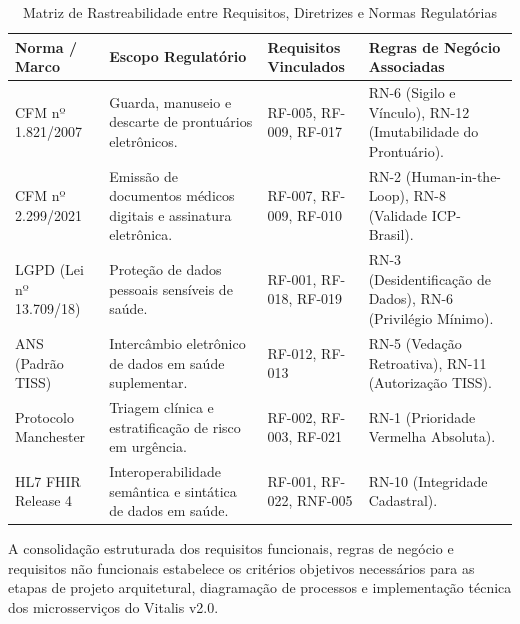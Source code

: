 \begin{table}[H]
\centering
\small
\caption{Matriz de Rastreabilidade entre Requisitos, Diretrizes e Normas Regulatórias}
\label{tab:rastreabilidade_vitalis}
\begin{tabularx}{\textwidth}{>{\raggedright\arraybackslash}p{2.6cm} >{\raggedright\arraybackslash}p{3.5cm} >{\raggedright\arraybackslash}p{3.5cm} >{\raggedright\arraybackslash}X}
\toprule
\textbf{Norma / Marco} & \textbf{Escopo Regulatório} & \textbf{Requisitos Vinculados} & \textbf{Regras de Negócio Associadas} \\
\midrule
CFM nº 1.821/2007 & Guarda, manuseio e descarte de prontuários eletrônicos. & RF-005, RF-009, RF-017 & RN-6 (Sigilo e Vínculo), RN-12 (Imutabilidade do Prontuário). \\
\addlinespace
CFM nº 2.299/2021 & Emissão de documentos médicos digitais e assinatura eletrônica. & RF-007, RF-009, RF-010 & RN-2 (Human-in-the-Loop), RN-8 (Validade ICP-Brasil). \\
\addlinespace
LGPD (Lei nº 13.709/18) & Proteção de dados pessoais sensíveis de saúde. & RF-001, RF-018, RF-019 & RN-3 (Desidentificação de Dados), RN-6 (Privilégio Mínimo). \\
\addlinespace
ANS (Padrão TISS) & Intercâmbio eletrônico de dados em saúde suplementar. & RF-012, RF-013 & RN-5 (Vedação Retroativa), RN-11 (Autorização TISS). \\
\addlinespace
Protocolo Manchester & Triagem clínica e estratificação de risco em urgência. & RF-002, RF-003, RF-021 & RN-1 (Prioridade Vermelha Absoluta). \\
\addlinespace
HL7 FHIR Release 4 & Interoperabilidade semântica e sintática de dados em saúde. & RF-001, RF-022, RNF-005 & RN-10 (Integridade Cadastral). \\
\bottomrule
\end{tabularx}
\end{table}

A consolidação estruturada dos requisitos funcionais, regras de negócio e requisitos não funcionais estabelece os critérios objetivos necessários para as etapas de projeto arquitetural, diagramação de processos e implementação técnica dos microsserviços do Vitalis v2.0.
